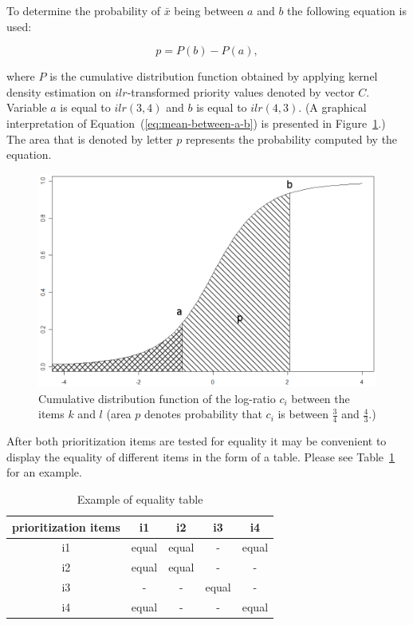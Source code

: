 To determine the probability of $\bar{x}$ being between $a$ and $b$ the following equation is used:

\begin{equation}
	p=P(b)-P(a)\label{eq:mean-between-a-b},
\end{equation}

where $P$ is the cumulative distribution function obtained by applying kernel density estimation on $ilr$-transformed priority values denoted by vector $C$. Variable $a$ is equal to $ilr(3,4)$ and $b$ is equal to $ilr(4,3)$. (A graphical interpretation of Equation~(\ref{eq:mean-between-a-b}) is presented in Figure~\ref{fig:Probability-p-that}.)
The area that is denoted by letter $p$ represents the probability computed by the equation.

\begin{figure}
	\center
\includegraphics[scale=0.2]{fig/p}
\caption{
	\label{fig:Probability-p-that}
	Cumulative distribution function of the log-ratio $c_{i}$ between the items $k$ and $l$ (area $p$ denotes probability that $c_{i}$ is between $\frac{3}{4}$ and $\frac{4}{3}$.)
}
\end{figure}

After both prioritization items are tested for equality it may
be convenient to display the equality of different items in the form of a table.
Please see Table~\ref{tab:ECVexample} for an example.

\begin{table}
	\scriptsize
	\centering
\caption{Example of equality table}

\label{tab:ECVexample}
\begin{tabular}{|c|c|c|c|c|}
\hline 
prioritization items & i1 & i2 & i3 & i4\tabularnewline
\hline\hline 
i1 & equal & equal & - & equal\tabularnewline
\hline 
i2 & equal & equal & - & -\tabularnewline
\hline 
i3 & - & - & equal & -\tabularnewline
\hline 
i4 & equal & - & - & equal\tabularnewline
\hline
\end{tabular}
\end{table}

